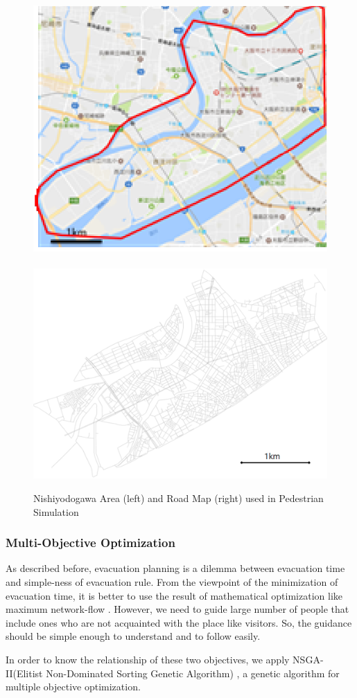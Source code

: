 \begin{figure}
  \centering
  \includegraphics[width=.49\linewidth]{Figs.noda/figure-08.nishiyodogawa.eps}~
  \includegraphics[width=0.49\linewidth]{Figs.noda/yodogawa_map}
  \caption{Nishiyodogawa Area (left) and
    Road Map (right) used in Pedestrian Simulation}
  \label{fig:Figs.noda/figure-08.nishiyodogawa.eps}
\end{figure}

\subsubsection{Multi-Objective Optimization}
\label{sss:moea}

As described before, evacuation planning is a dilemma
between evacuation time and simple-ness of evacuation rule.
From the viewpoint of the minimization of evacuation time,
it is better to use the result of mathematical optimization
like maximum network-flow \cite{kobayashi:2016}.
However, we need to guide large number of people that include
ones who are not acquainted with the place like visitors.
So, the guidance should be simple enough to understand and to follow easily.


In order to know the relationship of these two objectives,
we apply NSGA-II(Elitist Non-Dominated Sorting Genetic Algorithm)
\cite{deb:nsga}, a genetic algorithm for
multiple objective optimization\cite{deb:moea}.

